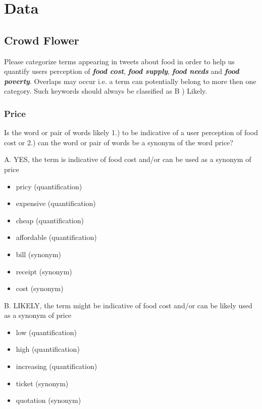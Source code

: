 \chapter{Data}

\section{Crowd Flower}

Please categorize terms appearing in tweets about food in order to help us quantify users perception of \textbf{\emph{food cost}}, \textbf{\emph{food supply}}, \textbf{\emph{food needs}} and \textbf{\emph{food poverty}}. Overlaps may occur i.e. a term can potentially belong to more then one category. Such keywords should always be classified as B ) Likely. 


\subsection{Price}

Is the word or pair of words likely 1.) to be indicative of a user perception of food cost or 2.) can the word or pair of words be a synonym of the word price?

A. YES, the term is indicative of food cost and/or can be used as a synonym of price

\begin{itemize}

  \item pricy (quantification)
  \item expensive (quantification)
  \item cheap (quantification) 
  \item affordable (quantification)
  \item bill (synonym)
  \item receipt (synonym) 
  \item cost (synonym)
\end{itemize}


B. LIKELY, the term might be indicative of food cost and/or can be likely used as a synonym of price

\begin{itemize}
  \item low (quantification)
  \item high (quantification)
  \item increasing (quantification)
  \item ticket (synonym)
  \item quotation (synonym)
\end{itemize}



